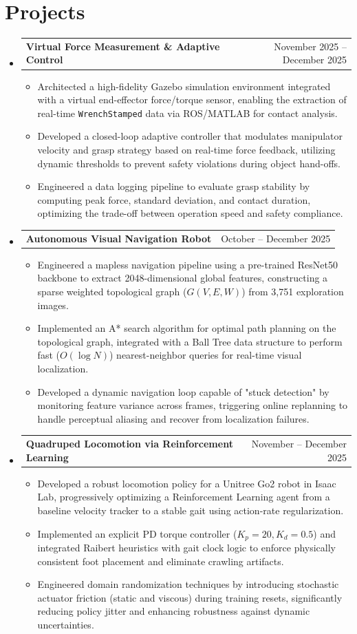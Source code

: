 \documentclass[a4paper,10pt]{article}
\makeatletter
\newcommand{\resumeItem}[1]{
  \item\small{
    {#1 \vspace{-2pt}}
  }
}
\newcommand{\resumeProjectHeading}[2]{
    \item
    \begin{tabular*}{0.97\textwidth}{l@{\extracolsep{\fill}}r}
      \small#1 & #2 \\
    \end{tabular*}\vspace{-5pt}
}
\makeatother
\begin{document}
\section{Projects}
  \begin{itemize}[leftmargin=0.15in, label={}]
  
    \resumeProjectHeading
      {\textbf{Virtual Force Measurement \& Adaptive Control}}{November 2025 -- December 2025}
      \begin{itemize}
        \resumeItem{Architected a high-fidelity Gazebo simulation environment integrated with a virtual end-effector force/torque sensor, enabling the extraction of real-time \texttt{WrenchStamped} data via ROS/MATLAB for contact analysis.}
        \resumeItem{Developed a closed-loop adaptive controller that modulates manipulator velocity and grasp strategy based on real-time force feedback, utilizing dynamic thresholds to prevent safety violations during object hand-offs.}
        \resumeItem{Engineered a data logging pipeline to evaluate grasp stability by computing peak force, standard deviation, and contact duration, optimizing the trade-off between operation speed and safety compliance.}
      \end{itemize}
      
    \resumeProjectHeading
      {\textbf{Autonomous Visual Navigation Robot}}{October -- December 2025}
      \begin{itemize}
        \resumeItem{Engineered a mapless navigation pipeline using a pre-trained ResNet50 backbone to extract 2048-dimensional global features, constructing a sparse weighted topological graph ($G(V,E,W)$) from 3,751 exploration images.}
        \resumeItem{Implemented an A* search algorithm for optimal path planning on the topological graph, integrated with a Ball Tree data structure to perform fast ($O(\log N)$) nearest-neighbor queries for real-time visual localization.}
        \resumeItem{Developed a dynamic navigation loop capable of "stuck detection" by monitoring feature variance across frames, triggering online replanning to handle perceptual aliasing and recover from localization failures.}  
      \end{itemize}

      \resumeProjectHeading
      {\textbf{Quadruped Locomotion via Reinforcement Learning}}{November -- December 2025}
      \begin{itemize}
        \resumeItem{Developed a robust locomotion policy for a Unitree Go2 robot in Isaac Lab, progressively optimizing a Reinforcement Learning agent from a baseline velocity tracker to a stable gait using action-rate regularization.}
        \resumeItem{Implemented an explicit PD torque controller ($K_p=20, K_d=0.5$) and integrated Raibert heuristics with gait clock logic to enforce physically consistent foot placement and eliminate crawling artifacts.}
        \resumeItem{Engineered domain randomization techniques by introducing stochastic actuator friction (static and viscous) during training resets, significantly reducing policy jitter and enhancing robustness against dynamic uncertainties.}
      \end{itemize}


\end{itemize}
\end{document}
